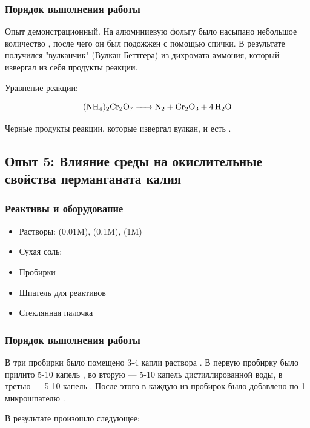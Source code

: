 \documentclass[a4paper, 12pt]{article}
\begin{document}
\subsubsection{Порядок выполнения работы}

Опыт демонстрационный. На алюминиевую фольгу было насыпано небольшое количество , после чего он был подожжен с помощью спички. В результате получился "вулканчик" (Вулкан Беттгера) из дихромата аммония, который извергал из себя продукты реакции.

Уравнение реакции:

\begin{equation}
	\ce{(NH4)2Cr2O7 -> N2 + Cr2O3 + 4H2O}
\end{equation}

Черные продукты реакции, которые извергал вулкан, и есть .

\subsection{Опыт 5: Влияние среды на окислительные свойства перманганата калия}

\subsubsection{Реактивы и оборудование}

\begin{itemize}
	\item Растворы:  (0.01M),  (0.1M),  (1M)
	
	\item Сухая соль: 
	
	\item Пробирки
	\item Шпатель для реактивов
	\item Стеклянная палочка
\end{itemize}

\subsubsection{Порядок выполнения работы}

В три пробирки было помещено 3-4 капли раствора . В первую пробирку было прилито 5-10 капель , во вторую --- 5-10 капель дистиллированной воды, в третью --- 5-10 капель . После этого в каждую из пробирок было добавлено по 1 микрошпателю .

В результате произошло следующее:
\end{document}
